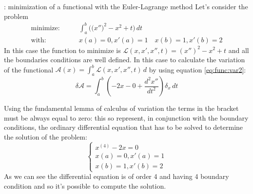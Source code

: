 	\begin{example}{: minimization of a functional with the Euler-Lagrange  method} \label{es:func:eullagmeth}
		Let's consider the problem 
		\begin{align*}
			\textrm{minimize:}& \qquad \int_a^b \Big( \big(x''\big)^2 - x^2 + t \Big)\,dt \\
			\textrm{with:}& \qquad x(a) = 0, x'(a) = 1 \quad x(b) = 1, x'(b) = 2
		\end{align*}
		In this case the function to minimize is $\mathcal L(x,x',x'',t) = (x'')^2 - x^2+t$ and all the boundaries conditions are well defined. In this case to calculate the variation of the functional $\mathcal A(x) = \int_a^b \mathcal L(x,x',x'',t)\, d$ by using equation \ref{eq:func:var2}:
		\[ \delta \mathcal A = \int_a^b \left( -2x - 0 + \frac{d^2x''}{dt^2} \right) \delta_x\, dt \]
		
		Using the fundamental lemma of calculus of variation the terms in the bracket must be always equal to zero: this so represent, in conjunction with the boundary conditions, the ordinary differential equation that has to be solved to determine the solution of the problem:
		\[ \begin{cases}
			x^{(4)} - 2x = 0 \\
			 x(a) = 0, x'(a) = 1 \\ x(b) = 1, x'(b) = 2
		\end{cases} \]	
		As we can see the differential equation is of order 4 and having 4 boundary condition and so it's possible to compute the solution.
	\end{example}
	
